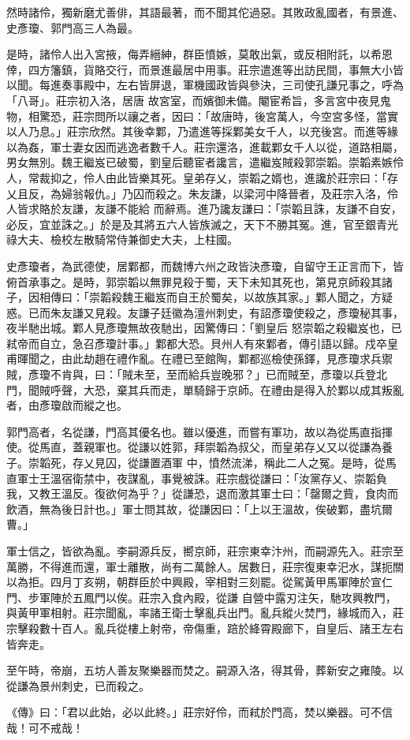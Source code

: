 \begin{pinyinscope}
 然時諸伶，獨新磨尤善俳，其語最著，而不聞其佗過惡。其敗政亂國者，有景進、史彥瓊、郭門高三人為最。



 是時，諸伶人出入宮掖，侮弄縉紳，群臣憤嫉，莫敢出氣，或反相附託，以希恩倖，四方籓鎮，貨賂交行，而景進最居中用事。莊宗遣進等出訪民間，事無大小皆以聞。每進奏事殿中，左右皆屏退，軍機國政皆與參決，三司使孔謙兄事之，呼為「八哥」。莊宗初入洛，居唐
 故宮室，而嬪御未備。閹宦希旨，多言宮中夜見鬼物，相驚恐，莊宗問所以禳之者，因曰：「故唐時，後宮萬人，今空宮多怪，當實以人乃息。」莊宗欣然。其後幸鄴，乃遣進等採鄴美女千人，以充後宮。而進等緣以為姦，軍士妻女因而逃逸者數千人。莊宗還洛，進載鄴女千人以從，道路相屬，男女無別。魏王繼岌已破蜀，劉皇后聽宦者讒言，遣繼岌賊殺郭崇韜。崇韜素嫉伶人，常裁抑之，伶人由此皆樂其死。皇弟存乂，崇韜之婿也，進讒於莊宗曰：「存乂且反，為婦翁報仇。」乃囚而殺之。朱友謙，以梁河中降晉者，及莊宗入洛，伶人皆求賂於友謙，友謙不能給
 而辭焉。進乃讒友謙曰：「崇韜且誅，友謙不自安，必反，宜並誅之。」於是及其將五六人皆族滅之，天下不勝其冤。進，官至銀青光祿大夫、檢校左散騎常侍兼御史大夫，上柱國。



 史彥瓊者，為武德使，居鄴都，而魏博六州之政皆決彥瓊，自留守王正言而下，皆俯首承事之。是時，郭崇韜以無罪見殺于蜀，天下未知其死也，第見京師殺其諸子，因相傳曰：「崇韜殺魏王繼岌而自王於蜀矣，以故族其家。」鄴人聞之，方疑惑。已而朱友謙又見殺。友謙子廷徽為澶州刺史，有詔彥瓊使殺之，彥瓊秘其事，夜半馳出城。鄴人見彥瓊無故夜馳出，因驚傳曰：「劉皇后
 怒崇韜之殺繼岌也，已弒帝而自立，急召彥瓊計事。」鄴都大恐。貝州人有來鄴者，傳引語以歸。戍卒皇甫暉聞之，由此劫趙在禮作亂。在禮已至館陶，鄴都巡檢使孫鐸，見彥瓊求兵禦賊，彥瓊不肯與，曰：「賊未至，至而給兵豈晚邪？」已而賊至，彥瓊以兵登北門，聞賊呼聲，大恐，棄其兵而走，單騎歸于京師。在禮由是得入於鄴以成其叛亂者，由彥瓊啟而縱之也。



 郭門高者，名從謙，門高其優名也。雖以優進，而嘗有軍功，故以為從馬直指揮使。從馬直，蓋親軍也。從謙以姓郭，拜崇韜為叔父，而皇弟存乂又以從謙為養子。崇韜死，存乂見囚，從謙置酒軍
 中，憤然流涕，稱此二人之冤。是時，從馬直軍士王溫宿衛禁中，夜謀亂，事覺被誅。莊宗戲從謙曰：「汝黨存乂、崇韜負我，又教王溫反。復欲何為乎？」從謙恐，退而激其軍士曰：「罄爾之貲，食肉而飲酒，無為後日計也。」軍士問其故，從謙因曰：「上以王溫故，俟破鄴，盡坑爾曹。」



 軍士信之，皆欲為亂。李嗣源兵反，嚮京師，莊宗東幸汴州，而嗣源先入。莊宗至萬勝，不得進而還，軍士離散，尚有二萬餘人。居數日，莊宗復東幸汜水，謀扼關以為拒。四月丁亥朔，朝群臣於中興殿，宰相對三刻罷。從駕黃甲馬軍陣於宣仁門、步軍陣於五鳳門以俟。莊宗入食內殿，從謙
 自營中露刃注矢，馳攻興教門，與黃甲軍相射。莊宗聞亂，率諸王衛士擊亂兵出門。亂兵縱火焚門，緣城而入，莊宗擊殺數十百人。亂兵從樓上射帝，帝傷重，踣於絳霄殿廊下，自皇后、諸王左右皆奔走。



 至午時，帝崩，五坊人善友聚樂器而焚之。嗣源入洛，得其骨，葬新安之雍陵。以從謙為景州刺史，已而殺之。



 《傳》曰：「君以此始，必以此終。」莊宗好伶，而弒於門高，焚以樂器。可不信哉！可不戒哉！



\end{pinyinscope}